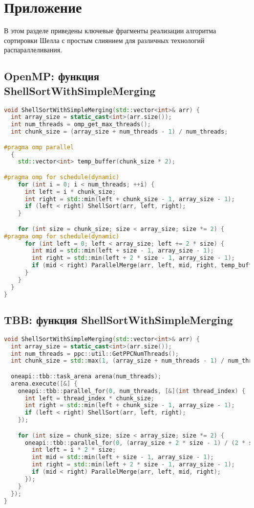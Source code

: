 \documentclass[12pt]{article}
\begin{document}
\section*{Приложение}

В этом разделе приведены ключевые фрагменты реализации алгоритма сортировки Шелла с простым слиянием для различных технологий распараллеливания.

\subsection*{OpenMP: функция ShellSortWithSimpleMerging}
\begin{lstlisting}[language=C++]
void ShellSortWithSimpleMerging(std::vector<int>& arr) {
  int array_size = static_cast<int>(arr.size());
  int num_threads = omp_get_max_threads();
  int chunk_size = (array_size + num_threads - 1) / num_threads;

#pragma omp parallel
  {
    std::vector<int> temp_buffer(chunk_size * 2);

#pragma omp for schedule(dynamic)
    for (int i = 0; i < num_threads; ++i) {
      int left = i * chunk_size;
      int right = std::min(left + chunk_size - 1, array_size - 1);
      if (left < right) ShellSort(arr, left, right);
    }

    for (int size = chunk_size; size < array_size; size *= 2) {
#pragma omp for schedule(dynamic)
      for (int left = 0; left < array_size; left += 2 * size) {
        int mid = std::min(left + size - 1, array_size - 1);
        int right = std::min(left + 2 * size - 1, array_size - 1);
        if (mid < right) ParallelMerge(arr, left, mid, right, temp_buffer);
      }
    }
  }
}
\end{lstlisting}

\subsection*{TBB: функция ShellSortWithSimpleMerging}
\begin{lstlisting}[language=C++]
void ShellSortWithSimpleMerging(std::vector<int>& arr) {
  int array_size = static_cast<int>(arr.size());
  int num_threads = ppc::util::GetPPCNumThreads();
  int chunk_size = std::max(1, (array_size + num_threads - 1) / num_threads);

  oneapi::tbb::task_arena arena(num_threads);
  arena.execute([&] {
    oneapi::tbb::parallel_for(0, num_threads, [&](int thread_index) {
      int left = thread_index * chunk_size;
      int right = std::min(left + chunk_size - 1, array_size - 1);
      if (left < right) ShellSort(arr, left, right);
    });

    for (int size = chunk_size; size < array_size; size *= 2) {
      oneapi::tbb::parallel_for(0, (array_size + 2 * size - 1) / (2 * size), [&](int i) {
        int left = i * 2 * size;
        int mid = std::min(left + size - 1, array_size - 1);
        int right = std::min(left + 2 * size - 1, array_size - 1);
        if (mid < right) ParallelMerge(arr, left, mid, right);
      });
    }
  });
}
\end{lstlisting}
\end{document}
